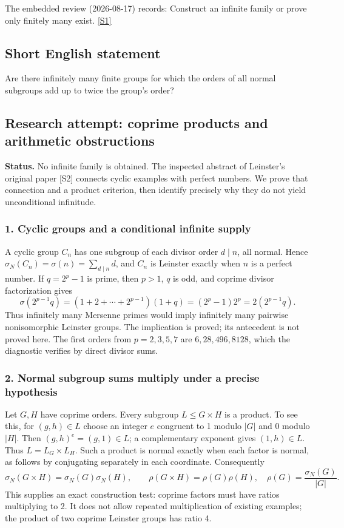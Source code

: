 \documentclass[11pt,a4paper]{article}
\newcommand{\sref}[2]{\hyperlink{source:#1:#2}{[S#2]}}
\begin{document}
The embedded review (2026-08-17) records: Construct an infinite family or prove only finitely many exist. \sref{1193}{1}

\subsection{Short English statement}

Are there infinitely many finite groups for which the orders of all normal subgroups add up to twice the group’s order?

\subsection{Research attempt: coprime products and arithmetic obstructions}
\textbf{Status.} No infinite family is obtained. The inspected abstract of Leinster's original paper [S2] connects cyclic examples with perfect numbers. We prove that connection and a product criterion, then identify precisely why they do not yield unconditional infinitude.

\subsubsection{1. Cyclic groups and a conditional infinite supply}
A cyclic group $C_n$ has one subgroup of each divisor order $d\mid n$, all normal. Hence $\sigma_N(C_n)=\sigma(n)=\sum_{d\mid n}d$, and $C_n$ is Leinster exactly when $n$ is a perfect number. If $q=2^p-1$ is prime, then $p>1$, $q$ is odd, and coprime divisor factorization gives
\[\sigma(2^{p-1}q)=(1+2+\cdots+2^{p-1})(1+q)
 =(2^p-1)2^p=2(2^{p-1}q).\]
Thus infinitely many Mersenne primes would imply infinitely many pairwise nonisomorphic Leinster groups. The implication is proved; its antecedent is not proved here. The first orders from $p=2,3,5,7$ are $6,28,496,8128$, which the diagnostic verifies by direct divisor sums.

\subsubsection{2. Normal subgroup sums multiply under a precise hypothesis}
Let $G,H$ have coprime orders. Every subgroup $L\leq G\times H$ is a product. To see this, for $(g,h)\in L$ choose an integer $e$ congruent to 1 modulo $|G|$ and 0 modulo $|H|$. Then $(g,h)^e=(g,1)\in L$; a complementary exponent gives $(1,h)\in L$. Thus $L=L_G\times L_H$. Such a product is normal exactly when each factor is normal, as follows by conjugating separately in each coordinate. Consequently
\[\sigma_N(G\times H)=\sigma_N(G)\sigma_N(H),\qquad
\rho(G\times H)=\rho(G)\rho(H),\quad
\rho(G)=\frac{\sigma_N(G)}{|G|}.\tag{1}\]
This supplies an exact construction test: coprime factors must have ratios multiplying to 2. It does not allow repeated multiplication of existing examples; the product of two coprime Leinster groups has ratio 4.
\end{document}
